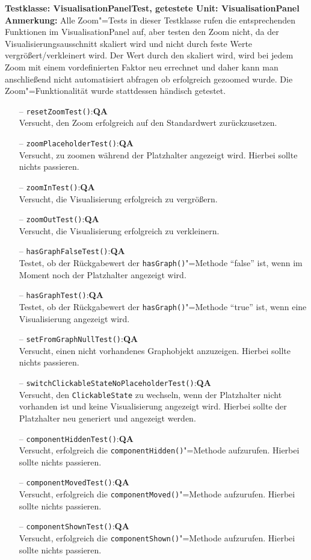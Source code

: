 \documentclass[parskip=full,11pt,twoside]{scrartcl}
\def\qa{\hfill\textbf{QA}}
\begin{document}
\newpage
\textbf{Testklasse: VisualisationPanelTest, getestete Unit: VisualisationPanel}\\
\textbf{Anmerkung:} Alle Zoom"=Tests in dieser Testklasse rufen die entsprechenden Funktionen im VisualisationPanel auf, aber testen den Zoom nicht, da der Visualisierungsausschnitt skaliert wird und nicht durch feste Werte vergrößert/verkleinert wird. Der Wert durch den skaliert wird, wird bei jedem Zoom mit einem vordefinierten Faktor neu errechnet und daher kann man anschließend nicht automatisiert abfragen ob erfolgreich gezoomed wurde. Die Zoom"=Funktionalität wurde stattdessen händisch getestet.
\begin{itemize}
	\item[--] \texttt{resetZoomTest()}:\qa\\
	Versucht, den Zoom erfolgreich auf den Standardwert zurückzusetzen.
	\item[--] \texttt{zoomPlaceholderTest()}:\qa\\
	Versucht, zu zoomen während der Platzhalter angezeigt wird. Hierbei sollte nichts passieren.
	\item[--] \texttt{zoomInTest()}:\qa\\
	Versucht, die Visualisierung erfolgreich zu vergrößern.
	\item[--] \texttt{zoomOutTest()}:\qa\\
	Versucht, die Visualisierung erfolgreich zu verkleinern.
	\item[--] \texttt{hasGraphFalseTest()}:\qa\\
	Testet, ob der Rückgabewert der \texttt{hasGraph()}"=Methode \enquote{false} ist, wenn im Moment noch der Platzhalter angezeigt wird.
	\item[--] \texttt{hasGraphTest()}:\qa\\
	Testet, ob der Rückgabewert der \texttt{hasGraph()}"=Methode \enquote{true} ist, wenn eine Visualisierung angezeigt wird.
	\item[--] \texttt{setFromGraphNullTest()}:\qa\\
	Versucht, einen nicht vorhandenes Graphobjekt anzuzeigen. Hierbei sollte nichts passieren.
	\item[--] \texttt{switchClickableStateNoPlaceholderTest()}:\qa\\
	Versucht, den \texttt{ClickableState} zu wechseln, wenn der Platzhalter nicht vorhanden ist und keine Visualisierung angezeigt wird. Hierbei sollte der Platzhalter neu generiert und angezeigt werden.
	\item[--] \texttt{componentHiddenTest()}:\qa\\
	Versucht, erfolgreich die \texttt{componentHidden()}"=Methode aufzurufen. Hierbei sollte nichts passieren.
	\item[--] \texttt{componentMovedTest()}:\qa\\
	Versucht, erfolgreich die \texttt{componentMoved()}"=Methode aufzurufen. Hierbei sollte nichts passieren.
	\item[--] \texttt{componentShownTest()}:\qa\\
	Versucht, erfolgreich die \texttt{componentShown()}"=Methode aufzurufen. Hierbei sollte nichts passieren.
\end{itemize}
\end{document}
